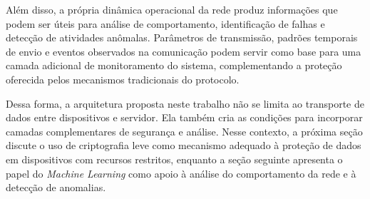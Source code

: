 Além disso, a própria dinâmica operacional da rede produz informações que podem ser úteis para análise de comportamento, identificação de falhas e detecção de atividades anômalas. Parâmetros de transmissão, padrões temporais de envio e eventos observados na comunicação podem servir como base para uma camada adicional de monitoramento do sistema, complementando a proteção oferecida pelos mecanismos tradicionais do protocolo.

Dessa forma, a arquitetura proposta neste trabalho não se limita ao transporte de dados entre dispositivos e servidor. Ela também cria as condições para incorporar camadas complementares de segurança e análise. Nesse contexto, a próxima seção discute o uso de criptografia leve como mecanismo adequado à proteção de dados em dispositivos com recursos restritos, enquanto a seção seguinte apresenta o papel do \textit{Machine Learning} como apoio à análise do comportamento da rede e à detecção de anomalias.


